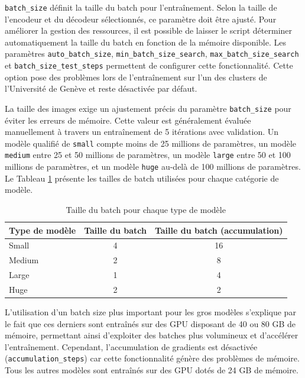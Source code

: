 \texttt{batch\_size} définit la taille du batch pour l'entraînement. Selon la taille de l'encodeur et du décodeur sélectionnés, ce paramètre doit être ajusté. Pour améliorer la gestion des ressources, il est possible de laisser le script déterminer automatiquement la taille du batch en fonction de la mémoire disponible. Les paramètres \texttt{auto\_batch\_size}, \texttt{min\_batch\_size\_search}, \texttt{max\_batch\_size\_search} et \texttt{batch\_size\_test\_steps} permettent de configurer cette fonctionnalité. Cette option pose des problèmes lors de l'entraînement sur l'un des clusters de l'Université de Genève et reste désactivée par défaut.

La taille des images exige un ajustement précis du paramètre \texttt{batch\_size} pour éviter les erreurs de mémoire. Cette valeur est généralement évaluée manuellement à travers un entraînement de 5 itérations avec validation. Un modèle qualifié de \texttt{small} compte moins de 25 millions de paramètres, un modèle \texttt{medium} entre 25 et 50 millions de paramètres, un modèle \texttt{large} entre 50 et 100 millions de paramètres, et un modèle \texttt{huge} au-delà de 100 millions de paramètres. Le Tableau \ref{tab:ch36_batch_size} présente les tailles de batch utilisées pour chaque catégorie de modèle.

\begin{table}[H]
    \centering
    \begin{tabular}{@{}lcc@{}}
    \toprule
    \textbf{Type de modèle} & \textbf{Taille du batch} & \textbf{Taille du batch (accumulation)} \\
    \midrule
    Small & 4 & 16 \\
    Medium & 2 & 8 \\
    Large & 1 & 4 \\
    Huge & 2 & 2 \\
    \bottomrule
    \end{tabular}
    \caption{Taille du batch pour chaque type de modèle}
    \label{tab:ch36_batch_size}
\end{table}

L'utilisation d'un batch size plus important pour les gros modèles s'explique par le fait que ces derniers sont entraînés sur des GPU disposant de 40 ou 80 GB de mémoire, permettant ainsi d'exploiter des batches plus volumineux et d'accélérer l'entraînement. Cependant, l'accumulation de gradients est désactivée (\texttt{accumulation\_steps}) car cette fonctionnalité génère des problèmes de mémoire. Tous les autres modèles sont entraînés sur des GPU dotés de 24 GB de mémoire.


